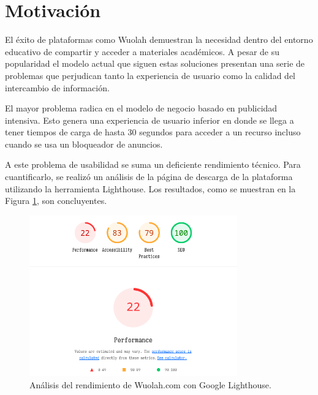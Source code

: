 



\section{Motivación}
El éxito de plataformas como Wuolah demuestran la necesidad dentro del entorno educativo de compartir y acceder a materiales académicos. A pesar de su popularidad el modelo actual que siguen estas soluciones presentan una serie de problemas que perjudican tanto la experiencia de usuario como la calidad del intercambio de información.

El mayor problema radica en el modelo de negocio basado en publicidad intensiva. Esto genera una experiencia de usuario inferior en donde se llega a tener tiempos de carga de hasta 30 segundos para acceder a un recurso incluso cuando se usa un bloqueador de anuncios.

A este problema de usabilidad se suma un deficiente rendimiento técnico. Para cuantificarlo, se realizó un análisis de la página de descarga de la plataforma utilizando la herramienta Lighthouse. Los resultados, como se muestran en la Figura \ref{fig:lighthouse}, son concluyentes.

\begin{figure}[h]
    \centering
    \includegraphics[width=0.8\textwidth]{Imagenes/Bitmap/lighthouse_wuolah.png}
    \caption{Análisis del rendimiento de Wuolah.com con Google Lighthouse.}
    \label{fig:lighthouse}
\end{figure}

